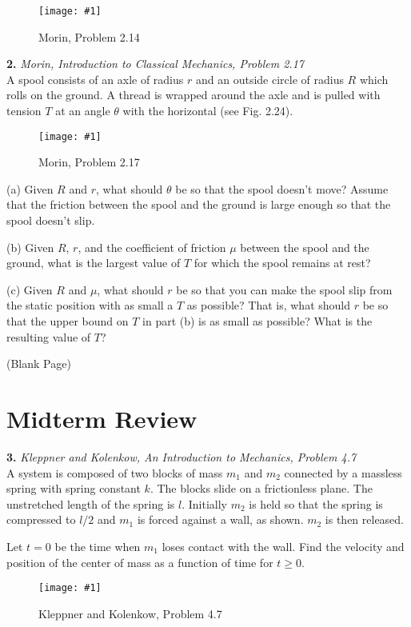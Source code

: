\documentclass[11pt]{article}
\newcommand{\fig}[4]{
    \begin{figure}[H]
        \centering
        \texttt{[image: \#1]}
        \caption{#2}
        \label{exp4fit}
    \end{figure}
}
\theoremstyle{gangnamstyle}{\newtheorem{definition}{Definition}[]}
\theoremstyle{gangnamstyle}{\newtheorem{example}{Example}[]}
\theoremstyle{gangnamstyle}{\newtheorem{problem}{Problem}[]}
\begin{document}
\fig{figs/0723/m221.png}{Morin, Problem 2.14}{0.6}{0}

\pagebreak

\textbf{2.} \textit{Morin, Introduction to Classical Mechanics, Problem 2.17} \\
A spool consists of an axle of radius $r$ and an outside circle of radius $R$ which rolls on the ground. A thread is wrapped around the axle and is pulled with tension $T$ at an angle $\theta$ with the horizontal (see Fig. 2.24). 

\fig{figs/0723/m224.png}{Morin, Problem 2.17}{0.6}{0}

(a) Given $R$ and $r$, what should $\theta$ be so that the spool doesn’t move? Assume that the friction between the spool and the ground is large enough so that the spool doesn’t slip.

(b) Given $R$, $r$, and the coefficient of friction $\mu$ between the spool and the ground, what is the largest value of $T$ for which the spool remains at rest?

(c) Given $R$ and $\mu$, what should $r$ be so that you can make the spool slip from the static position with as small a $T$ as possible? That is, what should $r$ be so that the upper bound on $T$ in part (b) is as small as possible? What is the resulting value of $T$?

\pagebreak

\begin{center}
(Blank Page)
\end{center}

\pagebreak

\section{Midterm Review}

\textbf{3.} \textit{Kleppner and Kolenkow, An Introduction to Mechanics, Problem 4.7} \\
A system is composed of two blocks of mass $m_1$ and $m_2$ connected by a massless spring with spring constant $k$. The blocks slide on a frictionless plane. The unstretched length of the spring is $l$. Initially $m_2$ is held so that the spring is compressed to $l/2$ and $m_1$ is forced against a wall, as shown. $m_2$ is then released.

Let $t = 0$ be the time when $m_1$ loses contact with the wall. Find the velocity and position of the center of mass as a function of time for $t \geq 0$. 

\fig{figs/0723/kk47.png}{Kleppner and Kolenkow, Problem 4.7}{0.6}{0}
\end{document}
